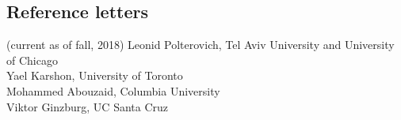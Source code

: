 \documentclass[overlapped,line,letterpaper]{res}
\begin{document}
\begin{resume}
\section {\sc Reference letters} (current as of fall, 2018)
Leonid Polterovich, Tel Aviv University and University of Chicago \\
Yael Karshon, University of Toronto \\
Mohammed Abouzaid, Columbia University \\
Viktor Ginzburg, UC Santa Cruz \\
 \end{resume}
 
\end{document}
